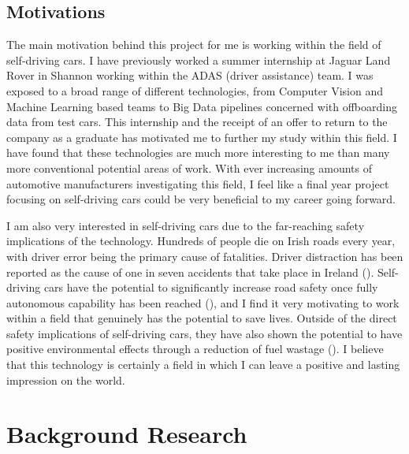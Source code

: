 \documentclass[12pt]{report}
\begin{document}
\section{Motivations}
\begin{flushleft}
The main motivation behind this project for me is working within the field of self-driving cars. I have previously worked a summer internship at Jaguar Land Rover in Shannon working within the ADAS (driver assistance) team. I was exposed to a broad range of different technologies, from Computer Vision and Machine Learning based teams to Big Data pipelines concerned with offboarding data from test cars. This internship and the receipt of an offer to return to the company as a graduate has motivated me to further my study within this field. I have found that these technologies are much more interesting to me than many more conventional potential areas of work. With ever increasing amounts of automotive manufacturers investigating this field, I feel like a final year project focusing on self-driving cars could be very beneficial to my career going forward.

I am also very interested in self-driving cars due to the far-reaching safety implications of the technology. Hundreds of people die on Irish roads every year, with driver error being the primary cause of fatalities. Driver distraction has been reported as the cause of one in seven accidents that take place in Ireland (\cite{rsadistraction}). Self-driving cars have the potential to significantly increase road safety once fully autonomous capability has been reached (\cite{milakis2017policy}), and I find it very motivating to work within a field that genuinely has the potential to save lives. Outside of the direct safety implications of self-driving cars, they have also shown the potential to have positive environmental effects through a reduction of fuel wastage (\cite{greenblatt2015autonomous}). I believe that this technology is certainly a field in which I can leave a positive and lasting impression on the world.
\end{flushleft}

\chapter{Background Research}
\end{document}
